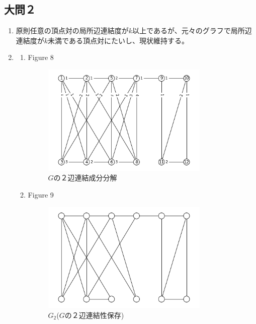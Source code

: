 \documentclass{report}
\begin{document}
\begin{CJK}{UTF8}{min}
    \subsection*{大問２}
    \begin{enumerate}
        \item 原則任意の頂点対の局所辺連結度が$k$以上であるが、元々のグラフで局所辺連結度が$k$未満である頂点対にたいし、現状維持する。
        \item
              \begin{enumerate}
                  \item Figure 8
                        \begin{figure}[!h]
                            \centerline{\includegraphics[width=0.8\textwidth]{data/MA.png}}
                            \caption{$G$の２辺連結成分分解}
                        \end{figure}
                  \item Figure 9
                        \begin{figure}[!h]
                            \centerline{\includegraphics[width=0.8\textwidth]{data/k-save.png}}
                            \caption{$G_2$($G$の２辺連結性保存)}
                        \end{figure}
              \end{enumerate}


\end{enumerate}
\end{CJK}
\end{document}

